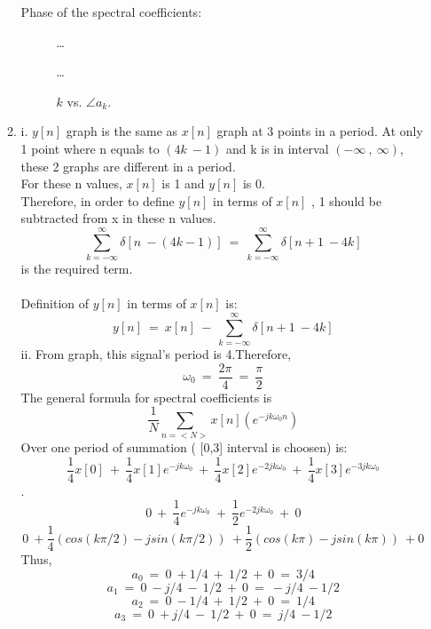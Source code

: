\documentclass[10pt,a4paper, margin=1in]{article}
\begin{document}
\begin{enumerate}
\begin{enumerate}
Phase of the spectral coefficients:

\begin{figure} [H]
	\ldots
    \centering
    \ldots
    \caption{$k$ vs. $\angle a_k$.}
    \label{fig:q3}
\end{figure}

    \item %
    
i. $y[n]$ graph is the same as $x[n]$ graph at 3 points in a period. At only 1 point where n equals to $(4k\ -1)$ and k is in interval $(-\infty\ ,\ \infty)$, these 2 graphs are different in a period.\\For these n values, $x[n]$ is 1 and $y[n]$ is 0.\\ Therefore, in order to define $y[n]$ in terms of $x[n]$ , 1 should be subtracted from x in these n values.
$$\sum_{k=-\infty}^{\infty} \delta[n\ - (4k-1)]\ =\ \sum_{k=-\infty}^{\infty} \delta[n+1\ -4k] $$ is the required term.\\\\
Definition of $y[n]$ in terms of $x[n]$ is:
$$ y[n]\ =\ x[n]\ -\ \sum_{k=-\infty}^{\infty} \delta[n+1\ -4k]  $$
ii. From graph, this signal's period is 4.Therefore,
$$\omega_0\ =\ \frac{2\pi}{4}\ = \ \frac{\pi}{2} $$
The general formula for spectral coefficients is $$ \frac{1}{N}\sum_{n=<N>}^{} x[n](e^{-jk\omega_0 n})$$
Over one period of summation ( [0,3] interval is choosen) is:
$$ \frac{1}{4}x[0]\ + \  \frac{1}{4}x[1]e^{-jk\omega_0}\ + \   \frac{1}{4}x[2]e^{-2jk\omega_0}\ + \  \frac{1}{4}x[3]e^{-3jk\omega_0}$$.\\
$$ 0\ + \  \frac{1}{4}e^{-jk\omega_0}\ + \   \frac{1}{2}e^{-2jk\omega_0}\ + \  0$$
$$0\ + \frac{1}{4}(cos(k \pi /2)-jsin(k \pi /2))\ + \frac{1}{2}(cos(k \pi)-jsin(k \pi))\ + 0$$
Thus,
$$ a_0\ =\ 0\ + 1/4\ +\ 1/2\ +\ 0\ =\ 3/4 $$
$$ a_1\ =\ 0\ - j/4\ -\ 1/2\ +\ 0\ =\ -j/4\ -1/2 $$
$$ a_2\ =\ 0\ - 1/4\ +\ 1/2\ +\ 0\ =\ 1/4 $$
$$ a_3\ =\ 0\ + j/4\ -\ 1/2\ +\ 0\ =\ j/4\ -1/2 $$


\end{enumerate}
\end{enumerate}
\end{document}
